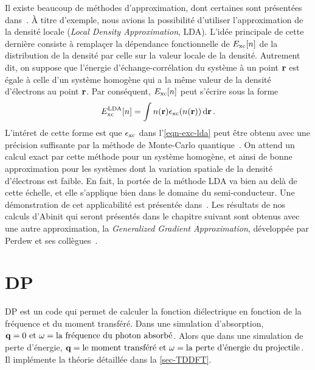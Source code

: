 Il existe beaucoup de méthodes d'approximation,
dont certaines sont présentées dans~\cite{Sottile2003}.
À titre d'exemple, 
nous avions la possibilité d'utiliser l'approximation de la densité locale (\textit{Local Density Approximation}, LDA).
L'idée principale de cette dernière consiste à remplaçer la dépendance fonctionnelle de $E_{\textnormal{xc}}[n]$
de la distribution de la densité par celle sur la valeur locale de la densité.
Autrement dit, on suppose que l'énergie d'échange-corrélation du système à un point $\vb{r}$
est égale à celle d'un système homogène qui a la même valeur de la densité d'électrons au point $\vb{r}$.
Par conséquent, $E_{\textnormal{xc}}[n]$ peut s'écrire sous la forme
\begin{equation}
  \label{eqn-exc-lda}
  E_{\textnormal{xc}}^{\textnormal{LDA}}[n] = \int n(\vb{r})\epsilon_{\textnormal{xc}}(n(\vb{r})) \dd{\vb{r}}.
\end{equation}
L'intéret de cette forme est que $\epsilon_{\textnormal{xc}}$ dans l'\cref{eqn-exc-lda} peut être obtenu avec
une précision suffisante par la méthode de Monte-Carlo quantique~\cite{ceperley1980}.
On attend un calcul exact par cette méthode pour un système homogène,
et ainsi de bonne approximation pour les systèmes dont la variation spatiale de la densité d'électrons est faible.
En fait, la portée de la méthode LDA va bien au delà de cette échelle,
et elle s'applique bien dans le domaine du semi-conducteur.
Une démonstration de cet applicabilité est présentée dans~\cite{Sottile2003}.
Les résultats de nos calculs d'Abinit qui seront présentés dans le chapitre suivant sont obtenus avec une autre approximation, la \textit{Generalized Gradient Approximation}, développée par Perdew et ses collègues~\cite{Perdew1986}.

\section{DP}
DP est un code qui permet de calculer la fonction diélectrique
en fonction de la fréquence et du moment transféré.
Dans une simulation d'absorption,
$\vb{q}=0 \text{ et } \omega = \text{la fréquence du photon absorbé}$.
Alors que dans une simulation de perte d'énergie,
$\vb{q}= \text{le moment transféré et } \omega = \text{la perte d'énergie du projectile}$.
Il implémente la théorie détaillée dans la \cref{sec-TDDFT}.


